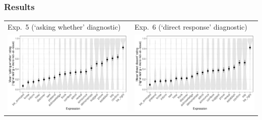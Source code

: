 \documentclass[compress, xcolor = dvipsnames, aspectratio=169, handout]{beamer}
\begin{document}
	\begin{frame}[t]\frametitle{Results}\scriptsize
		\begin{minipage}{\textwidth}
	      \centering
	      \begin{tabular}{p{.48\linewidth} p{.48\linewidth}}
	      	Exp.~5 (`asking whether' diagnostic)
	      	&
	      	Exp.~6 (`direct response' diagnostic)\\ 
	      	\includegraphics[width=\linewidth]{../../results/exp5/graphs/mean-ratings.pdf}%
	      	&
	      	\includegraphics[width=\linewidth]{../../results/exp6/graphs/mean-ratings.pdf}
	      	\\
	      \end{tabular}
	    \end{minipage}


\end{frame}
\end{document}
